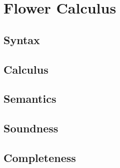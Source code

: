 \setchapterpreamble[u]{\margintoc}
\chapter{Flower Calculus}

\section{Syntax}

\section{Calculus}

\section{Semantics}

\section{Soundness}

\section{Completeness}